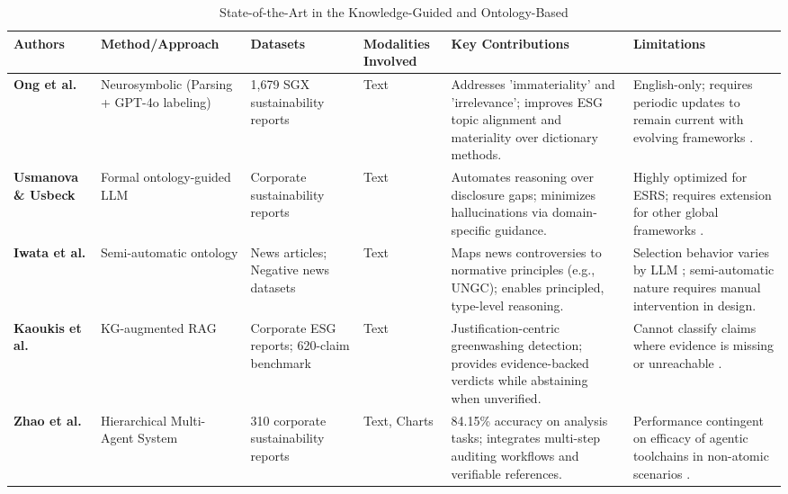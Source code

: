 \documentclass[english, online, cse, master]{dithesis}
\begin{document}
\begin{landscape}
\begin{table}[p]
\centering
\caption{State-of-the-Art in the Knowledge-Guided and Ontology-Based}
\label{tab:knowledge-guided-ontology-based}
\small
\renewcommand{\arraystretch}{1.2}
\begin{tabularx}{\linewidth}{|p{1.8cm}|p{3cm}|p{3cm}|p{1.8cm}|X|X|}
\hline
Authors & Method/Approach & Datasets & Modalities Involved & Key Contributions & Limitations \\ \hline
\textbf{Ong et al. } \parencite{keane_ong_8fec4760} & Neurosymbolic (Parsing + GPT-4o labeling) & 1,679 SGX sustainability reports & Text & Addresses 'immateriality' and 'irrelevance'; improves ESG topic alignment and materiality over dictionary methods. & English-only; requires periodic updates to remain current with evolving frameworks  \parencite{keane_ong_8fec4760}. \\ \hline
\textbf{Usmanova \& Usbeck } \parencite{aida_usmanova_e9b44e1d} & Formal ontology-guided LLM & Corporate sustainability reports & Text & Automates reasoning over disclosure gaps; minimizes hallucinations via domain-specific guidance. & Highly optimized for ESRS; requires extension for other global frameworks  \parencite{aida_usmanova_e9b44e1d}. \\ \hline
\textbf{Iwata et al. } \parencite{tsuyoshi_iwata_18ccc0b8} & Semi-automatic ontology & News articles; Negative news datasets & Text & Maps news controversies to normative principles (e.g., UNGC); enables principled, type-level reasoning. & Selection behavior varies by LLM  \parencite{tsuyoshi_iwata_18ccc0b8}; semi-automatic nature requires manual intervention in design. \\ \hline
\textbf{Kaoukis et al. } \parencite{kaoukis__georgios_35bab107} & KG-augmented RAG & Corporate ESG reports; 620-claim benchmark  \parencite{georgios_kaoukis_91737dd6} & Text & Justification-centric greenwashing detection; provides evidence-backed verdicts while abstaining when unverified. & Cannot classify claims where evidence is missing or unreachable  \parencite{kaoukis__georgios_35bab107}. \\ \hline
\textbf{Zhao et al. } \parencite{yilei_zhao_b7bbd9c8} & Hierarchical Multi-Agent System & 310 corporate sustainability reports & Text, Charts & 84.15\% accuracy on analysis tasks; integrates multi-step auditing workflows and verifiable references. & Performance contingent on efficacy of agentic toolchains in non-atomic scenarios  \parencite{yilei_zhao_b7bbd9c8}. \\ \hline

\end{tabularx}
\end{table}
\end{landscape}
\end{document}
